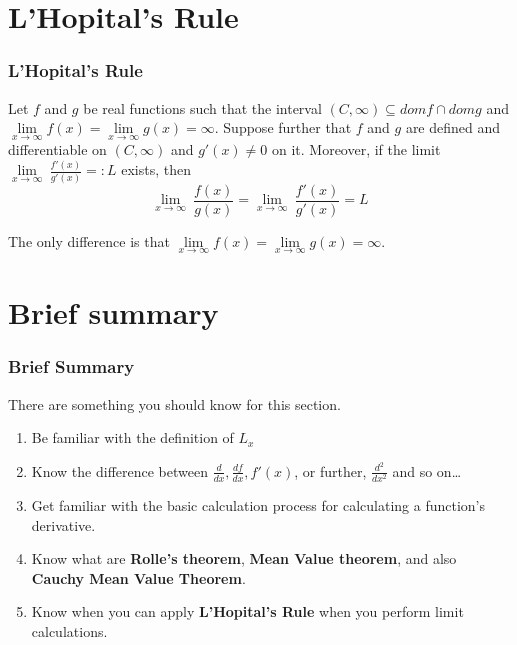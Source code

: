 \documentclass[12pt, t]{beamer}
\begin{document}
\section{L'Hopital's Rule}
\begin{frame}
    \frametitle{L'Hopital's Rule}
Let $f$ and $g$ be real functions such that the interval $(C,\infty)\subseteq domf\cap domg$ and 
$\underset{x\rightarrow \infty }{\lim}f(x)=\underset{x\rightarrow \infty }{\lim}g(x)=\infty$. Suppose further that $f$ and $g$ are defined 
and differentiable on $(C,\infty)$ and $g'(x)\neq 0$ on it. Moreover, if the limit $\underset{x\rightarrow \infty }{\lim}\ \frac{f'(x)}{g'(x)}=:L$ exists, then 
\begin{equation*}
    \underset{x\rightarrow\infty}{\lim}\ \frac{f(x)}{g(x)}=\underset{x\rightarrow\infty}{\lim}\ \frac{f'(x)}{g'(x)}=L
\end{equation*}

\vspace{0.5em}
\hspace{1em}
The only difference is that $\underset{x\rightarrow\infty}{\lim}f(x)=\underset{x\rightarrow \infty }{\lim}g(x)=\infty$.    
\end{frame}


\section{Brief summary}
\begin{frame}
    \frametitle{Brief Summary}
    There are something you should know for this section.
    \vspace{1em}
\begin{enumerate}
    \item Be familiar with the definition of $L_x$
    \vspace{0.5em}
    \item Know the difference between $\frac{d}{dx}, \frac{df}{dx},f'(x)$, or further, $\frac{d^2}{dx^2}$ and so on\dots
    \vspace{0.5em}
    \item Get familiar with the basic calculation process for calculating a function's derivative.
    \vspace{0.5em}
    \item Know what are \textbf{Rolle's theorem}, \textbf{Mean Value theorem}, and also \textbf{Cauchy Mean Value Theorem}.
    \vspace{0.5em}
    \item Know when you can apply \textbf{L'Hopital's Rule} when you perform limit calculations.
\end{enumerate}
\end{frame}
\end{document}
